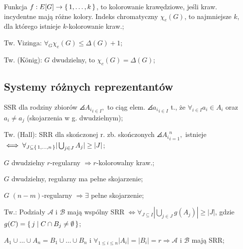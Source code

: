 Funkcja $f: E[G] \rightarrow \set{1, \dots, k}$, to kolorowanie krawędziowe,
  jeśli kraw. incydentne mają różne kolory. Indeks chromatyczny $\chi_e(G)$, to
  najmniejsze $k$, dla którego istnieje $k$-kolorowanie kraw.;

Tw. Vizinga: $\forall_G \chi_e(G) \leq \Delta(G) +1$;

Tw. (K{\"o}nig): $G$ dwudzielny, to $\chi_e(G) = \Delta(G)$;

\subsection{Systemy różnych reprezentantów}

SSR dla rodziny zbiorów $\angles{A_i}_{i\in I},$ to ciąg elem.
  $\angles{a_i}_{i\in I}$ t., że
  $\forall_{i\in I} a_i \in A_i$ oraz $a_i \neq a_j$
  (skojarzenia w g. dwudzielnym);

Tw. (Hall): SRR dla skończonej r. zb. skończonych $\angles{A_i}_{i=1}^n,$
  istnieje
  $\iff \forall_{J\subseteq\set{1,\dots,n}} |\bigcup_{j\in J}A_j| \geq |J|$;

$G$ dwudzielny $r$-regularny $\Rightarrow r$-kolorowalny kraw.;

$G$ dwudzielny, regularny ma pełne skojarzenie;

$G$ $(n-m)$-regularny $\Rightarrow \exists$ pełne skojarzenie;

Tw.: Podziały $\mathcal{A}$ i $\mathcal{B}$ mają wspólny SRR $\Leftrightarrow
  \forall_{J\subseteq I} |\bigcup_{j\in J}g(A_j)| \geq |J|$, gdzie
  $g(C) = \set{j | C \cap B_j \neq \emptyset}$;

$A_1 \cup \dots \cup A_n = B_1 \cup \dots \cup B_n$ i
  $\forall_{1 \leq i \leq n}|A_i| = |B_i| =r \Rightarrow \mathcal{A}$ i
  $\mathcal{B}$ mają SRR;
